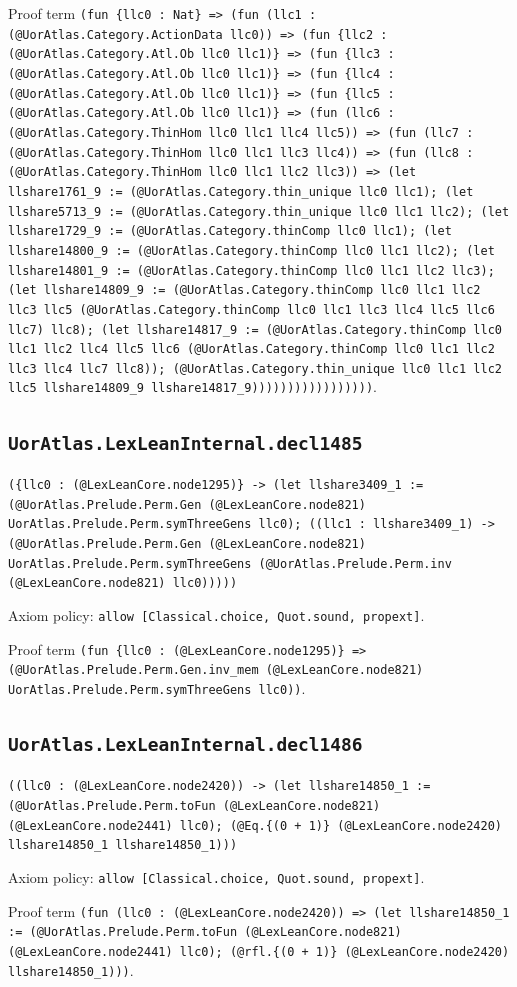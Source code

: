 \documentclass[11pt]{article}
\begin{document}
\noindent Proof term \texttt{(fun \{llc0 : Nat\} => (fun (llc1 : (@UorAtlas.Category.ActionData llc0)) => (fun \{llc2 : (@UorAtlas.Category.Atl.Ob llc0 llc1)\} => (fun \{llc3 : (@UorAtlas.Category.Atl.Ob llc0 llc1)\} => (fun \{llc4 : (@UorAtlas.Category.Atl.Ob llc0 llc1)\} => (fun \{llc5 : (@UorAtlas.Category.Atl.Ob llc0 llc1)\} => (fun (llc6 : (@UorAtlas.Category.ThinHom llc0 llc1 llc4 llc5)) => (fun (llc7 : (@UorAtlas.Category.ThinHom llc0 llc1 llc3 llc4)) => (fun (llc8 : (@UorAtlas.Category.ThinHom llc0 llc1 llc2 llc3)) => (let llshare1761\_9 := (@UorAtlas.Category.thin\_unique llc0 llc1); (let llshare5713\_9 := (@UorAtlas.Category.thin\_unique llc0 llc1 llc2); (let llshare1729\_9 := (@UorAtlas.Category.thinComp llc0 llc1); (let llshare14800\_9 := (@UorAtlas.Category.thinComp llc0 llc1 llc2); (let llshare14801\_9 := (@UorAtlas.Category.thinComp llc0 llc1 llc2 llc3); (let llshare14809\_9 := (@UorAtlas.Category.thinComp llc0 llc1 llc2 llc3 llc5 (@UorAtlas.Category.thinComp llc0 llc1 llc3 llc4 llc5 llc6 llc7) llc8); (let llshare14817\_9 := (@UorAtlas.Category.thinComp llc0 llc1 llc2 llc4 llc5 llc6 (@UorAtlas.Category.thinComp llc0 llc1 llc2 llc3 llc4 llc7 llc8)); (@UorAtlas.Category.thin\_unique llc0 llc1 llc2 llc5 llshare14809\_9 llshare14817\_9)))))))))))))))))}.\par
\subsection*{\texttt{UorAtlas.LexLeanInternal.decl1485}}
\noindent\texttt{(\{llc0 : (@LexLeanCore.node1295)\} -> (let llshare3409\_1 := (@UorAtlas.Prelude.Perm.Gen (@LexLeanCore.node821) UorAtlas.Prelude.Perm.symThreeGens llc0); ((llc1 : llshare3409\_1) -> (@UorAtlas.Prelude.Perm.Gen (@LexLeanCore.node821) UorAtlas.Prelude.Perm.symThreeGens (@UorAtlas.Prelude.Perm.inv (@LexLeanCore.node821) llc0)))))}\par
\noindent Axiom policy: \texttt{allow [Classical.choice, Quot.sound, propext]}.\par
\noindent Proof term \texttt{(fun \{llc0 : (@LexLeanCore.node1295)\} => (@UorAtlas.Prelude.Perm.Gen.inv\_mem (@LexLeanCore.node821) UorAtlas.Prelude.Perm.symThreeGens llc0))}.\par
\subsection*{\texttt{UorAtlas.LexLeanInternal.decl1486}}
\noindent\texttt{((llc0 : (@LexLeanCore.node2420)) -> (let llshare14850\_1 := (@UorAtlas.Prelude.Perm.toFun (@LexLeanCore.node821) (@LexLeanCore.node2441) llc0); (@Eq.\{(0 + 1)\} (@LexLeanCore.node2420) llshare14850\_1 llshare14850\_1)))}\par
\noindent Axiom policy: \texttt{allow [Classical.choice, Quot.sound, propext]}.\par
\noindent Proof term \texttt{(fun (llc0 : (@LexLeanCore.node2420)) => (let llshare14850\_1 := (@UorAtlas.Prelude.Perm.toFun (@LexLeanCore.node821) (@LexLeanCore.node2441) llc0); (@rfl.\{(0 + 1)\} (@LexLeanCore.node2420) llshare14850\_1)))}.\par
\end{document}

